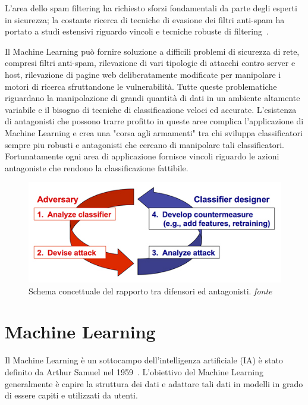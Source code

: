 L'area dello spam filtering ha richiesto sforzi fondamentali da parte degli esperti in sicurezza; la costante ricerca di tecniche di evasione dei filtri anti-spam ha portato a studi estensivi riguardo vincoli e tecniche robuste di filtering~\cite{dalvi}. 

Il Machine Learning può fornire soluzione a difficili problemi di sicurezza di rete, compresi filtri anti-spam, rilevazione di vari tipologie di attacchi contro server e host, rilevazione di pagine web deliberatamente modificate per manipolare i motori di ricerca sfruttandone le vulnerabilità. Tutte queste problematiche riguardano la manipolazione di grandi quantità di dati in un ambiente altamente variabile e il bisogno di tecniche di classificazione veloci ed accurate. L'esistenza di antagonisti che possono trarre profitto in queste aree complica l'applicazione di Machine Learning e crea una "corsa agli armamenti" tra chi sviluppa classificatori sempre piu robusti e antagonisti che cercano di manipolare tali classificatori. Fortunatamente ogni area di applicazione fornisce vincoli riguardo le azioni antagoniste che rendono la classificazione fattibile. 

\begin{figure}[!bp]
	\centering
	\includegraphics[width=\columnwidth]{figures/Reactive_arms_race.jpg}
	\caption{Schema concettuale del rapporto tra difensori ed antagonisti. \textit{fonte}%
	~\cite{wiki:Adversarial_machine_learning} \label{fig:advarms} }
\end{figure}

\newpage
\section{Machine Learning}
\label{sec:machinelearning}
Il Machine Learning è un sottocampo dell'intelligenza artificiale (IA) è stato definito da Arthur Samuel nel 1959~\cite{5392560}. L'obiettivo del Machine Learning generalmente è capire la struttura dei dati e adattare tali dati in modelli in grado di essere capiti e utilizzati da utenti.

